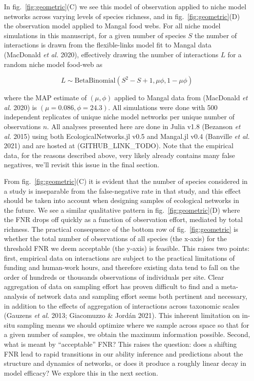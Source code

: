 \documentclass[11pt]{article}
\begin{document}
In fig.~\ref{fig:geometric}(C) we see this model of observation applied
to niche model networks across varying levels of species richness, and
in fig.~\ref{fig:geometric}(D) the observation model applied to Mangal
food webs. For all niche model simulations in this manuscript, for a
given number of species \(S\) the number of interactions is drawn from
the flexible-links model fit to Mangal data (MacDonald \emph{et al.}
2020), effectively drawing the number of interactions \(L\) for a random
niche model food-web as

\[L \sim  \text{BetaBinomial}(S^2-S+1,\mu\phi, 1-\mu\phi)\]

where the MAP estimate of \((\mu, \phi)\) applied to Mangal data from
(MacDonald \emph{et al.} 2020) is \((\mu=0.086, \phi=24.3)\). All
simulations were done with 500 independent replicates of unique niche
model networks per unique number of observations \(n\). All analyses
presented here are done in Julia v1.8 (Bezanson \emph{et al.} 2015)
using both EcologicalNetworks.jl v0.5 and Mangal.jl v0.4 (Banville
\emph{et al.} 2021) and are hosted at (GITHUB\_LINK\_TODO). Note that
the empirical data, for the reasons described above, very likely already
contains many false negatives, we'll revisit this issue in the final
section.

From fig.~\ref{fig:geometric}(C) it is evident that the number of
species considered in a study is inseparable from the false-negative
rate in that study, and this effect should be taken into account when
designing samples of ecological networks in the future. We see a similar
qualitative pattern in fig.~\ref{fig:geometric}(D) where the FNR drops
off quickly as a function of observation effort, mediated by total
richness. The practical consequence of the bottom row of
fig.~\ref{fig:geometric} is whether the total number of observations of
all species (the x-axis) for the threshold FNR we deem acceptable (the
y-axis) is feasible. This raises two points: first, empirical data on
interactions are subject to the practical limitations of funding and
human-work hours, and therefore existing data tend to fall on the order
of hundreds or thousands observations of individuals per site. Clear
aggregation of data on sampling effort has proven difficult to find and
a meta-analysis of network data and sampling effort seems both pertinent
and necessary, in addition to the effects of aggregation of interactions
across taxonomic scales (Gauzens \emph{et al.} 2013; Giacomuzzo \&
Jordán 2021). This inherent limitation on in-situ sampling means we
should optimize where we sample across space so that for a given number
of samples, we obtain the maximum information possible. Second, what is
meant by ``acceptable'' FNR? This raises the question: does a shifting
FNR lead to rapid transitions in our ability inference and predictions
about the structure and dynamics of networks, or does it produce a
roughly linear decay in model efficacy? We explore this in the next
section.
\end{document}
